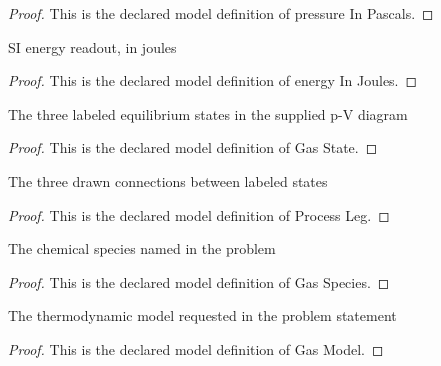 \begin{proof}
  This is the declared model definition of pressure In Pascals.
\end{proof}
\begin{definition}
  \label{def:physics:phyx-mini-0344:phyxminiproblems-problemphyxmini0344-energyinjoules}
  SI energy readout, in joules
\end{definition}
\begin{proof}
  This is the declared model definition of energy In Joules.
\end{proof}
\begin{definition}
  \label{def:physics:phyx-mini-0344:phyxminiproblems-problemphyxmini0344-gasstate}
  The three labeled equilibrium states in the supplied p-V diagram
\end{definition}
\begin{proof}
  This is the declared model definition of Gas State.
\end{proof}
\begin{definition}
  \label{def:physics:phyx-mini-0344:phyxminiproblems-problemphyxmini0344-processleg}
  The three drawn connections between labeled states
\end{definition}
\begin{proof}
  This is the declared model definition of Process Leg.
\end{proof}
\begin{definition}
  \label{def:physics:phyx-mini-0344:phyxminiproblems-problemphyxmini0344-gasspecies}
  The chemical species named in the problem
\end{definition}
\begin{proof}
  This is the declared model definition of Gas Species.
\end{proof}
\begin{definition}
  \label{def:physics:phyx-mini-0344:phyxminiproblems-problemphyxmini0344-gasmodel}
  The thermodynamic model requested in the problem statement
\end{definition}
\begin{proof}
  This is the declared model definition of Gas Model.
\end{proof}
